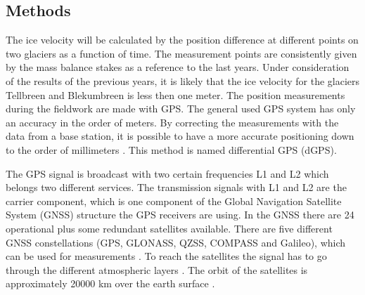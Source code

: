 \subsection{Methods}\label{GPS:subsec:methods}

The ice velocity will be calculated by the position difference at different points on two glaciers as a function of time.
The measurement points are consistently given by the mass balance stakes as a reference to the last years.
Under consideration of the results of the previous years, it is likely that the ice velocity for the glaciers Tellbreen and Blekumbreen is less then one meter.
The position measurements during the fieldwork are made with GPS. 
The general used GPS system has only an accuracy in the order of meters.
By correcting the measurements with the data from a base station, it is possible to have a more accurate positioning down to the order of millimeters \citep{UGPS}. 
This method is named differential GPS (dGPS).
\medskip

The GPS signal is broadcast with two certain frequencies L1 and L2 which belongs two different services.
The transmission signals with L1 and L2 are the carrier component, which is one component of the Global Navigation Satellite System (GNSS) structure the GPS receivers are using.
In the GNSS there are 24 operational plus some redundant satellites available.
There are five different GNSS constellations (GPS, GLONASS, QZSS, COMPASS and Galileo), which can be used for measurements \citep{Trprocess}.
To reach the satellites the signal has to go through the different atmospheric layers \citep{churcherdgps}.
The orbit of the satellites is approximately 20000 km over the earth surface \citep{Trprocess}.
\medskip

